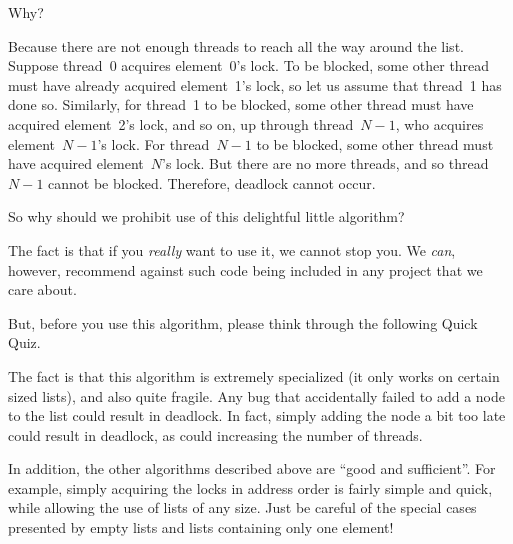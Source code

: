 Why?

Because there are not enough threads to reach all the way around the list.
Suppose thread~0 acquires element~0's lock.
To be blocked, some other thread must have already acquired element~1's
lock, so let us assume that thread~1 has done so.
Similarly, for thread~1 to be blocked, some other thread must have acquired
element~2's lock, and so on, up through thread~$N-1$, who acquires
element~$N-1$'s lock.
For thread~$N-1$ to be blocked, some other thread must have acquired
element~$N$'s lock.
But there are no more threads, and so thread~$N-1$ cannot be blocked.
Therefore, deadlock cannot occur.

So why should we prohibit use of this delightful little algorithm?

The fact is that if you \emph{really} want to use it, we cannot stop you.
We \emph{can}, however, recommend against such code being included
in any project that we care about.

But, before you use this algorithm, please think through the following
Quick Quiz.

\QuickQuizEnd

The fact is that this algorithm is extremely specialized (it only works
on certain sized lists), and also quite fragile.
Any bug that accidentally failed to add a node to the list could result
in deadlock.
In fact, simply adding the node a bit too late could result in deadlock,
as could increasing the number of threads.

In addition, the other algorithms described above are ``good and sufficient''.
For example, simply acquiring the locks in address order is fairly simple
and quick, while allowing the use of lists of any size.
Just be careful of the special cases presented by empty lists and lists
containing only one element!

\QuickQuizEnd

